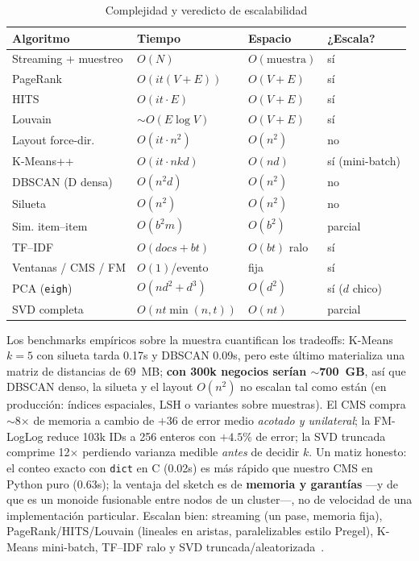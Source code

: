 \documentclass[conference]{IEEEtran}
\begin{document}
\begin{table}[H]
  \caption{Complejidad y veredicto de escalabilidad}
  \centering
  \scriptsize
  \setlength{\tabcolsep}{3pt}
  \begin{tabular}{llll}
    \toprule
    Algoritmo & Tiempo & Espacio & ¿Escala? \\
    \midrule
    Streaming + muestreo & $O(N)$ & $O(\text{muestra})$ & sí \\
    PageRank             & $O(it(V{+}E))$ & $O(V{+}E)$ & sí \\
    HITS                 & $O(it \cdot E)$ & $O(V{+}E)$ & sí \\
    Louvain              & $\sim O(E\log V)$ & $O(V{+}E)$ & sí \\
    Layout force-dir.    & $O(it \cdot n^2)$ & $O(n^2)$ & no \\
    K-Means++            & $O(it \cdot nkd)$ & $O(nd)$ & sí (mini-batch) \\
    DBSCAN (D densa)     & $O(n^2 d)$ & $O(n^2)$ & no \\
    Silueta              & $O(n^2)$ & $O(n^2)$ & no \\
    Sim. item--item      & $O(b^2 m)$ & $O(b^2)$ & parcial \\
    TF--IDF              & $O(docs + bt)$ & $O(bt)$ ralo & sí \\
    Ventanas / CMS / FM  & $O(1)$/evento & fija & sí \\
    PCA (\texttt{eigh})  & $O(nd^2{+}d^3)$ & $O(d^2)$ & sí ($d$ chico) \\
    SVD completa         & $O(nt\min(n,t))$ & $O(nt)$ & parcial \\
    \bottomrule
  \end{tabular}
  \label{tab:complejidad}
\end{table}

Los benchmarks empíricos sobre la muestra cuantifican los tradeoffs: K-Means $k=5$ con silueta tarda 0.17s y DBSCAN 0.09s, pero este último materializa una matriz de distancias de 69~MB; \textbf{con 300k negocios serían $\sim$700~GB}, así que DBSCAN denso, la silueta y el layout $O(n^2)$ no escalan tal como están (en producción: índices espaciales, LSH o variantes sobre muestras). El CMS compra $\sim$8$\times$ de memoria a cambio de $+36$ de error medio \emph{acotado y unilateral}; la FM-LogLog reduce 103k IDs a 256 enteros con $+4.5\%$ de error; la SVD truncada comprime 12$\times$ perdiendo varianza medible \emph{antes} de decidir $k$. Un matiz honesto: el conteo exacto con \texttt{dict} en C (0.02s) es más rápido que nuestro CMS en Python puro (0.63s); la ventaja del sketch es de \textbf{memoria y garantías} ---y de que es un monoide fusionable entre nodos de un cluster---, no de velocidad de una implementación particular. Escalan bien: streaming (un pase, memoria fija), PageRank/HITS/Louvain (lineales en aristas, paralelizables estilo Pregel), K-Means mini-batch, TF--IDF ralo y SVD truncada/aleatorizada~\cite{mmds}.
\end{document}
